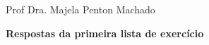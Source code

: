 
\usepackage{fullpage}      %
\usepackage{indentfirst}   %



\noindent Prof Dra. Majela Penton Machado
\\

\noindent \centerline{\textbf{Respostas da primeira lista de exercício}}
\\








